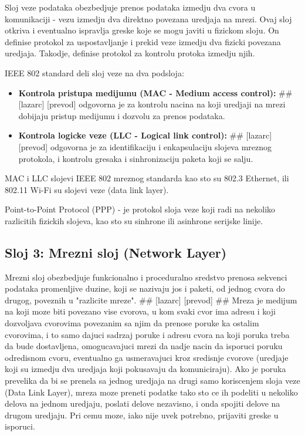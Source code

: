 \documentclass[a4paper,12pt, master]{etf}
\begin{document}
	Sloj veze podataka obezbedjuje prenos podataka izmedju dva cvora u komunikaciji - vezu izmedju
	dva direktno povezana uredjaja na mrezi. Ovaj sloj otkriva i eventualno ispravlja greske koje
	se mogu javiti u fizickom sloju. On definise protokol za uspostavljanje i prekid veze izmedju
	dva fizicki povezana uredjaja. Takodje, definise protokol za kontrolu protoka izmedju njih.

	IEEE 802 standard deli sloj veze na dva podsloja:
	\begin{itemize}
		\item \textbf{Kontrola pristupa medijumu (MAC - Medium access control):}
		\#\# [lazarc] [prevod]
		odgovorna je za kontrolu nacina na koji uredjaji na mrezi dobijaju pristup medijumu i
		dozvolu za prenos podataka.
		\item \textbf{Kontrola logicke veze (LLC - Logical link control):}
		\#\# [lazarc] [prevod]
		odgovorna je za identifikaciju i enkapsulaciju slojeva mreznog protokola, i kontrolu
		gresaka i sinhronizaciju paketa koji se salju.
	\end{itemize}

	MAC i LLC slojevi IEEE 802 mreznog standarda kao sto su 802.3 Ethernet, ili 802.11 Wi-Fi su
	slojevi veze (data link layer).

	Point-to-Point Protocol (PPP) - je protokol sloja veze koji radi na nekoliko razlicitih
	fizickih slojeva, kao sto su sinhrone ili asinhrone serijske linije.

	\subsection{Sloj 3: Mrezni sloj (Network Layer)}

	Mrezni sloj obezbedjuje funkcionalno i proceduralno sredstvo prenosa sekvenci podataka
	promenljive duzine, koji se nazivaju jos i paketi, od jednog cvora do drugog, poveznih u
	"razlicite mreze". \#\# [lazarc] [prevod] \#\# Mreza je medijum na koji moze biti povezano vise
	cvorova, u kom svaki cvor ima adresu i koji dozvoljava cvorovima povezanim sa njim da prenose
	poruke ka ostalim cvorovima, i to samo dajuci sadrzaj poruke i adresu cvora na koji poruka
	treba da bude dostavljena, omogucavajuci mrezi da nadje nacin da isporuci poruku odredisnom
	cvoru, eventualno ga usmeravajuci kroz sredisnje cvorove (uredjaje koji su izmedju dva uredjaja
	koji pokusavaju da komuniciraju). Ako je poruka prevelika da bi se prenela sa jednog uredjaja
	na drugi samo koriscenjem sloja veze (Data Link Layer), mreza moze preneti podatke tako sto ce
	ih podeliti u nekoliko delova na jednom uredjaju, poslati delove nezavisno, i onda spojiti
	delove na drugom uredjaju. Pri cemu moze, iako nije uvek potrebno, prijaviti greske u isporuci.
\end{document}
